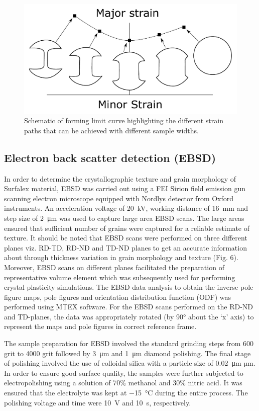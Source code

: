 \documentclass[11pt]{article} %
\begin{document}
\begin{figure}[h]
	\includegraphics[width=\textwidth]{figures/strain_path}
	\centering
	\caption{Schematic of forming limit curve highlighting the different strain paths that can be achieved with different sample widths.}
	\label{fig:strain_path}
\end{figure}


\subsection{Electron back scatter detection (EBSD)}
In order to determine the crystallographic texture and grain morphology of Surfalex material, EBSD was carried out using a FEI Sirion field emission gun scanning electron microscope equipped with Nordlys detector from Oxford instruments. An acceleration voltage of \SI{20}{\kilo\volt}, working distance of \SI{16}{\milli\meter} and step size of \SI{2}{\micro\meter} was used to capture large area EBSD scans. The large areas ensured that sufficient number of grains were captured for a reliable estimate of texture. It should be noted that EBSD scans were performed on three different planes viz. RD-TD, RD-ND and TD-ND planes to get an accurate information about through thickness variation in grain morphology and texture (Fig. 6). Moreover, EBSD scans on different planes facilitated the preparation of representative volume element which was subsequently used for performing crystal plasticity simulations. The EBSD data analysis to obtain the inverse pole figure maps, pole figures and orientation distribution function (ODF) was performed using MTEX software. For the EBSD scans performed on the RD-ND and TD-planes, the data was appropriately rotated (by \ang{90} about the ‘x’ axis) to represent the maps and pole figures in correct reference frame. 


The sample preparation for EBSD involved the standard grinding steps from 600 grit to 4000 grit followed by \SI{3}{\micro\meter} and \SI{1}{\micro\meter} diamond polishing. The final stage of polishing involved the use of colloidal silica with a particle size of \SI{0.02}{\micro\meter} µm. In order to ensure good surface quality, the samples were further subjected to electropolishing using a solution of 70\% methanol and 30\% nitric acid. It was ensured that the electrolyte was kept at \SI{-15}{\celsius} during the entire process. The polishing voltage and time were \SI{10}{\volt} and \SI{10}{\second}, respectively. 
\end{document}

